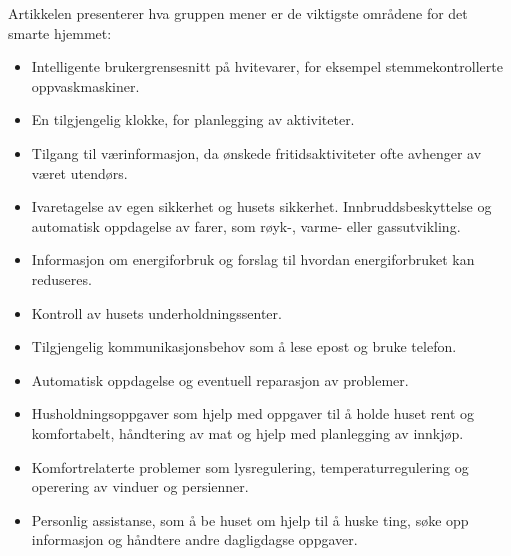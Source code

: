 Artikkelen presenterer hva gruppen mener er de viktigste områdene for det smarte hjemmet:
\begin{itemize}
  \item Intelligente brukergrensesnitt på hvitevarer, for eksempel stemmekontrollerte oppvaskmaskiner.
  \item En tilgjengelig klokke, for planlegging av aktiviteter.
  \item Tilgang til værinformasjon, da ønskede fritidsaktiviteter ofte avhenger av været utendørs.
  \item Ivaretagelse av egen sikkerhet og husets sikkerhet. Innbruddsbeskyttelse og automatisk oppdagelse av farer, som røyk-, varme- eller gassutvikling.
  \item Informasjon om energiforbruk og forslag til hvordan energiforbruket kan reduseres.
  \item Kontroll av husets underholdningssenter.
  \item Tilgjengelig kommunikasjonsbehov som å lese epost og bruke telefon.
  \item Automatisk oppdagelse og eventuell reparasjon av problemer.
  \item Husholdningsoppgaver som hjelp med oppgaver til å holde huset rent og komfortabelt, håndtering av mat og hjelp med planlegging av innkjøp.
  \item Komfortrelaterte problemer som lysregulering, temperaturregulering og operering av vinduer og persienner.
  \item Personlig assistanse, som å be huset om hjelp til å huske ting, søke opp informasjon og håndtere andre dagligdagse oppgaver.
\end{itemize}

